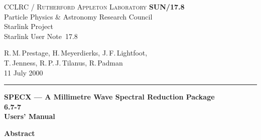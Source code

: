 \documentclass[twoside,11pt]{article}
\newcommand{\stardoccategory}  {Starlink User Note}
\newcommand{\stardocinitials}  {SUN}
\newcommand{\stardocnumber}    {17.8}
\newcommand{\stardocauthors}   {R.\,M.\,Prestage, H.\,Meyerdierks,
J.\,F.\,Lightfoot, \\ T.\,Jenness, R.\,P.\,J.\,Tilanus, R.\,Padman}
\newcommand{\stardocdate}      {11 July 2000}
\newcommand{\stardoctitle}     {SPECX --- A Millimetre Wave Spectral Reduction
Package}
\newcommand{\stardocversion}   {6.7-7}
\newcommand{\stardocmanual}    {Users' Manual}
\newcommand{\stardocname}{\stardocinitials /\stardocnumber}
\newenvironment{latexonly}{}{}
\renewcommand{\_}{\texttt{\symbol{95}}}
\begin{document}
\thispagestyle{empty}

\begin{latexonly}
   CCLRC / \textsc{Rutherford Appleton Laboratory} \hfill \textbf{\stardocname}\\
   {\large Particle Physics \& Astronomy Research Council}\\
   {\large Starlink Project\\}
   {\large \stardoccategory\ \stardocnumber}
   \begin{flushright}
   \stardocauthors\\
   \stardocdate
   \end{flushright}
   \vspace{-4mm}
   \rule{\textwidth}{0.5mm}
   \vspace{5mm}
   \begin{center}
   {\Huge\textbf{\stardoctitle \\ [2.5ex]}}
   {\LARGE\textbf{\stardocversion \\ [4ex]}}
   {\Huge\textbf{\stardocmanual}}
   \end{center}
   \vspace{5mm}


   \vspace{10mm}
   \begin{center}
      {\Large\textbf{Abstract}}
   \end{center}
\end{latexonly}
\end{document}
